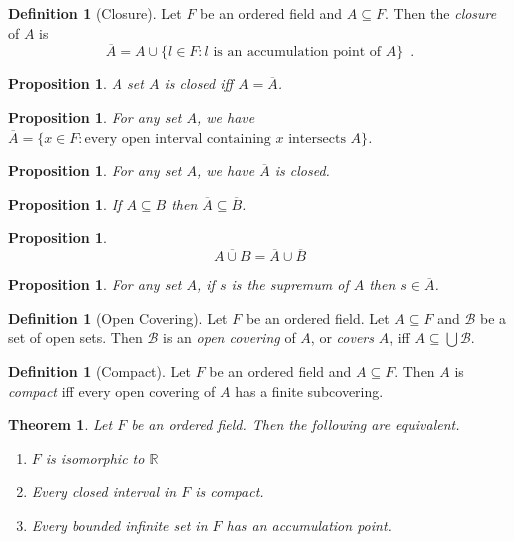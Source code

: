 \documentclass{article}
\newtheorem{proposition}[axiom]{Proposition}
\newtheorem{theorem}[axiom]{Theorem}
\theoremstyle{definition}
\newtheorem{definition}[axiom]{Definition}
\begin{document}
\begin{definition}[Closure]
    Let $F$ be an ordered field and $A \subseteq F$. Then the \emph{closure} of $A$ is
    \[ \overline{A} = A \cup \{ l \in F : \text{$l$ is an accumulation point of $A$} \} \enspace . \]
\end{definition}

\begin{proposition}
    A set $A$ is closed iff $A = \overline{A}$.
\end{proposition}

\begin{proposition}
    For any set $A$, we have $\overline{A} = \{ x \in F : \text{every open interval containing $x$ intersects $A$} \}$.
\end{proposition}

\begin{proposition}
    For any set $A$, we have $\overline{A}$ is closed.
\end{proposition}

\begin{proposition}
    If $A \subseteq B$ then $\overline{A} \subseteq \overline{B}$.
\end{proposition}

\begin{proposition}
    \[ \overline{A \cup B} = \overline{A} \cup \overline{B} \]
\end{proposition}

\begin{proposition}
    For any set $A$, if $s$ is the supremum of $A$ then $s \in \overline{A}$.
\end{proposition}

\begin{definition}[Open Covering]
    Let $F$ be an ordered field. Let $A \subseteq F$ and $\mathcal{B}$ be a set of open sets. Then $\mathcal{B}$ is an
    \emph{open covering} of $A$, or \emph{covers} $A$, iff $A \subseteq \bigcup \mathcal{B}$.
\end{definition}

\begin{definition}[Compact]
    Let $F$ be an ordered field and $A \subseteq F$. Then $A$ is \emph{compact} iff every open covering of $A$ has a finite subcovering.
\end{definition}

\begin{theorem}
    \label{theorem:complete_ordered_field}
    Let $F$ be an ordered field. Then the following are equivalent.
    \begin{enumerate}
        \item $F$ is isomorphic to $\mathbb{R}$
        \item Every closed interval in $F$ is compact.
        \item Every bounded infinite set in $F$ has an accumulation point.
    \end{enumerate}
\end{theorem}
\end{document}
